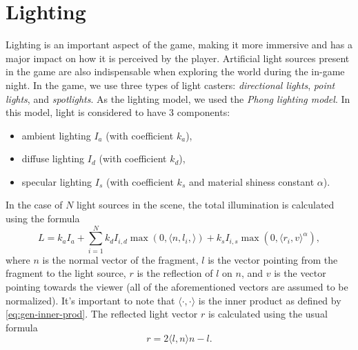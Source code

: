 \section{Lighting}\label{sec:theory_theory_lighting}
Lighting is an important aspect of the game, making it more immersive and has a major impact on how it is perceived by the player.
Artificial light sources present in the game are also indispensable when exploring the world during the in-game night.
In the game, we use three types of light casters: \textit{directional lights}, \textit{point lights}, and \textit{spotlights}.
As the lighting model, we used the \textit{Phong lighting model}.
In this model, light is considered to have 3 components:
\begin{itemize}
    \item ambient lighting $I_a$ (with coefficient $k_a$),
    \item diffuse lighting $I_d$ (with coefficient $k_d$),
    \item specular lighting $I_s$ (with coefficient $k_s$ and material shiness constant $\alpha$).
\end{itemize}
In the case of $N$ light sources in the scene, the total illumination is calculated using the formula
\begin{equation}
    L = k_a I_a + \sum_{i = 1}^N {k_d I_{i, d} \max(0, \langle n, l_i, \rangle) + k_s I_{i, s} \max(0, \langle r_i, v \rangle^\alpha )},
\end{equation}
where $n$ is the normal vector of the fragment, $l$ is the vector pointing from the fragment to the light source, $r$ is the reflection of $l$ on $n$, and $v$ is the vector pointing towards the viewer (all of the aforementioned vectors are assumed to be normalized).
It's important to note that $\langle \cdot, \cdot\rangle$ is the inner product as defined by \autoref{eq:gen-inner-prod}.
The reflected light vector $r$ is calculated using the usual formula
\begin{equation*}
    r = 2 \langle l, n \rangle n - l.
\end{equation*}



